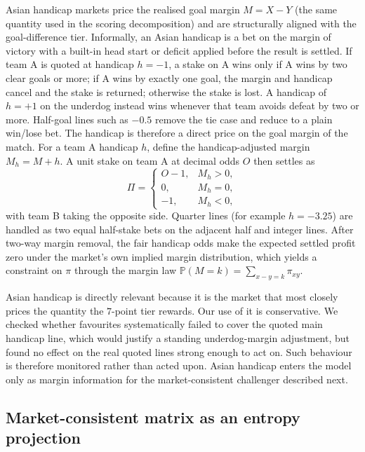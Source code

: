 \documentclass[11pt]{article}
\newcommand{\Prob}{\mathbb{P}}
\begin{document}
Asian handicap markets price the realised goal margin $M=X-Y$ (the same quantity used in the
scoring decomposition) and are structurally aligned with the goal-difference tier. Informally, an
Asian handicap is a bet on the margin of victory with a built-in head start or deficit applied
before the result is settled. If team A is quoted at handicap $h=-1$, a stake on A wins only if A
wins by two clear goals or more; if A wins by exactly one goal, the margin and handicap cancel and the
stake is returned; otherwise the stake is lost. A handicap of $h=+1$ on the underdog instead wins
whenever that team avoids defeat by two or more. Half-goal lines such as $-0.5$ remove the tie case
and reduce to a plain win/lose bet. The handicap is therefore a direct price on the goal margin of the match. For a
team A handicap $h$, define the handicap-adjusted margin $M_h=M+h$. A unit stake on team A at
decimal odds $O$ then settles as
\begin{equation}
\Pi=
\begin{cases}
O-1, & M_h>0,\\
0,   & M_h=0,\\
-1,  & M_h<0,
\end{cases}
\label{eq:ah}
\end{equation}
with team B taking the opposite side. Quarter lines (for example $h=-3.25$) are handled as two equal half-stake bets on the adjacent half and integer lines. After two-way margin removal, the fair handicap odds make the expected settled profit zero under the market's own implied margin distribution, which yields a constraint on $\pi$ through the margin law $\Prob(M=k)=\sum_{x-y=k}\pi_{xy}$.

Asian handicap is directly relevant because it is the market that most closely prices the
quantity the $7$-point tier rewards. Our use of it is conservative. We checked whether favourites systematically failed to cover the quoted main handicap line,
which would justify a standing underdog-margin adjustment, but found no effect on the real
quoted lines strong enough to act on. Such behaviour is therefore monitored rather than acted upon. Asian handicap
enters the model only as margin information for the market-consistent challenger described next.

\subsection{Market-consistent matrix as an entropy projection}
\label{sec:entropy}
\end{document}
